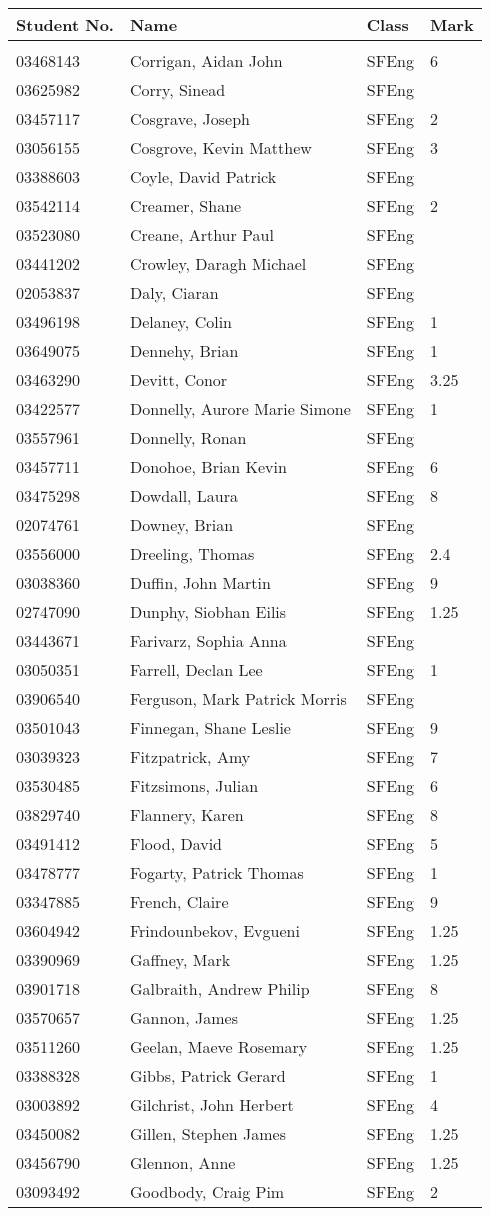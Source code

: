 \documentclass[a4paper]{article}
\begin{document}
\begin{tabular}{llll}
Student No.&Name&Class&Mark\\[3pt]
 \hline\\[3pt]
03468143&Corrigan, Aidan John&SFEng&6\\
03625982&Corry, Sinead&SFEng&\\
03457117&Cosgrave, Joseph&SFEng&2\\
03056155&Cosgrove, Kevin Matthew&SFEng&3\\
03388603&Coyle, David Patrick&SFEng&\\
03542114&Creamer, Shane&SFEng&2\\
03523080&Creane, Arthur Paul&SFEng&\\
03441202&Crowley, Daragh Michael&SFEng&\\
02053837&Daly, Ciaran&SFEng&\\
03496198&Delaney, Colin&SFEng&1\\
03649075&Dennehy, Brian&SFEng&1\\
03463290&Devitt, Conor&SFEng&3.25\\
03422577&Donnelly, Aurore Marie Simone&SFEng&1\\
03557961&Donnelly, Ronan&SFEng&\\
03457711&Donohoe, Brian Kevin&SFEng&6\\
03475298&Dowdall, Laura&SFEng&8\\
02074761&Downey, Brian&SFEng&\\
03556000&Dreeling, Thomas&SFEng&2.4\\
03038360&Duffin, John Martin&SFEng&9\\
02747090&Dunphy, Siobhan Eilis&SFEng&1.25\\
03443671&Farivarz, Sophia Anna&SFEng&\\
03050351&Farrell, Declan Lee&SFEng&1\\
03906540&Ferguson, Mark Patrick Morris&SFEng&\\
03501043&Finnegan, Shane Leslie&SFEng&9\\
03039323&Fitzpatrick, Amy&SFEng&7\\
03530485&Fitzsimons, Julian&SFEng&6\\
03829740&Flannery, Karen&SFEng&8\\
03491412&Flood, David&SFEng&5\\
03478777&Fogarty, Patrick Thomas&SFEng&1\\
03347885&French, Claire&SFEng&9\\
03604942&Frindounbekov, Evgueni&SFEng&1.25\\
03390969&Gaffney, Mark&SFEng&1.25\\
03901718&Galbraith, Andrew Philip&SFEng&8\\
03570657&Gannon, James&SFEng&1.25\\
03511260&Geelan, Maeve Rosemary&SFEng&1.25\\
03388328&Gibbs, Patrick Gerard&SFEng&1\\
03003892&Gilchrist, John Herbert&SFEng&4\\
03450082&Gillen, Stephen James&SFEng&1.25\\
03456790&Glennon, Anne&SFEng&1.25\\
03093492&Goodbody, Craig Pim&SFEng&2\\
\end{tabular}
\end{document}
